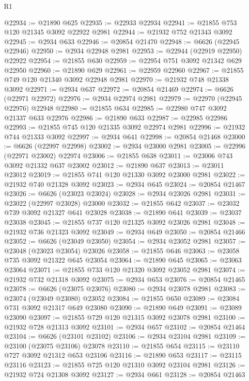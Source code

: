 \begin{lexlean}{R1}
\begin{coremodule}
@22934 := @21890 @625
@22935 := @22933 @22934
@22941 := @21855 @753 @120 @21345 @3092 @22922 @2981
@22944 := @21932 @752 @21343 @3092
@22945 := @2934 @633
@22946 := @20854 @21470
@22948 := @6626 (@22945 @22946)
@22950 := @2934 @22948 @2981
@22953 := @22944 (@22919 @22950) @22922
@22954 := @21855 @630
@22959 := @22954 @751 @3092 @21342 @629 @22950
@22960 := @21890 @629
@22961 := @22959 @22960
@22967 := @21855 @749 @120 @21340 @3092 @22948 @2981
@22970 := @21932 @748 @21338 @3092
@22971 := @2934 @637
@22972 := @20854 @21469
@22974 := @6626 (@22971 @22972)
@22976 := @2934 @22974 @2981
@22979 := @22970 (@22945 @22976) @22948
@22980 := @21855 @634
@22985 := @22980 @747 @3092 @21337 @633 @22976
@22986 := @21890 @633
@22987 := @22985 @22986
@22993 := @21855 @745 @120 @21335 @3092 @22974 @2981
@22996 := @21932 @744 @21333 @3092
@22997 := @2934 @641
@22998 := @20854 @21468
@23000 := @6626 (@22997 @22998)
@23002 := @2934 @23000 @2981
@23005 := @22996 (@22971 @23002) @22974
@23006 := @21855 @638
@23011 := @23006 @743 @3092 @21332 @637 @23002
@23012 := @21890 @637
@23013 := @23011 @23012
@23019 := @21855 @741 @120 @21330 @3092 @23000 @2981
@23022 := @21932 @740 @21328 @3092
@23023 := @2934 @645
@23024 := @20854 @21467
@23026 := @6626 (@23023 @23024)
@23028 := @2934 @23026 @2981
@23031 := @23022 (@22997 @23028) @23000
@23032 := @21855 @642
@23037 := @23032 @739 @3092 @21327 @641 @23028
@23038 := @21890 @641
@23039 := @23037 @23038
@23045 := @21855 @737 @120 @21325 @3092 @23026 @2981
@23048 := @21932 @736 @21323 @3092
@23049 := @2934 @649
@23050 := @20854 @21466
@23052 := @6626 (@23049 @23050)
@23054 := @2934 @23052 @2981
@23057 := @23048 (@23023 @23054) @23026
@23058 := @21855 @646
@23063 := @23058 @735 @3092 @21322 @645 @23054
@23064 := @21890 @645
@23065 := @23063 @23064
@23071 := @21855 @733 @120 @21320 @3092 @23052 @2981
@23074 := @21932 @732 @21318 @3092
@23075 := @2934 @653
@23076 := @20854 @21465
@23078 := @6626 (@23075 @23076)
@23080 := @2934 @23078 @2981
@23083 := @23074 (@23049 @23080) @23052
@23084 := @21855 @650
@23089 := @23084 @731 @3092 @21317 @649 @23080
@23090 := @21890 @649
@23091 := @23089 @23090
@23097 := @21855 @729 @120 @21315 @3092 @23078 @2981
@23100 := @21932 @728 @21313 @3092
@23101 := @2934 @657
@23102 := @20854 @21464
@23104 := @6626 (@23101 @23102)
@23106 := @2934 @23104 @2981
@23109 := @23100 (@23075 @23106) @23078
@23110 := @21855 @654
@23115 := @23110 @727 @3092 @21312 @653 @23106
@23116 := @21890 @653
@23117 := @23115 @23116
@23123 := @21855 @725 @120 @21310 @3092 @23104 @2981
@23126 := @21932 @724 @21308 @3092
@23127 := @2934 @661
@23128 := @20854 @21463

\end{coremodule}
\end{lexlean}
